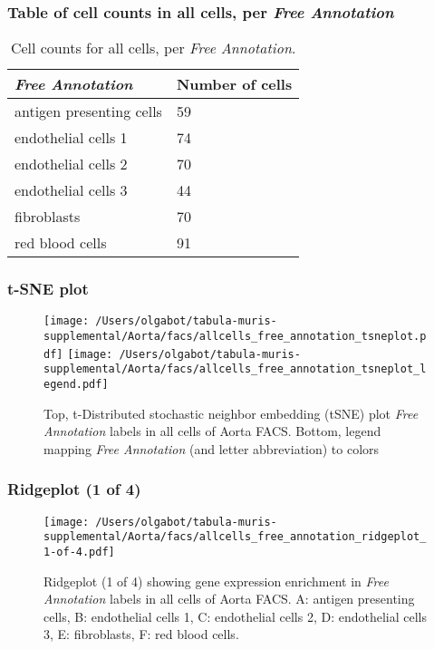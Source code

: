 \subsubsection{Table of cell counts in all cells, per \emph{Free Annotation}}\begin{table}[h]
\centering
\label{my-label}
\begin{tabular}{@{}ll@{}}
\toprule

\emph{Free Annotation}& Number of cells \\ \midrule
antigen presenting cells & 59 \\

endothelial cells 1 & 74 \\

endothelial cells 2 & 70 \\

endothelial cells 3 & 44 \\

fibroblasts & 70 \\

red blood cells & 91 \\
\bottomrule
\end{tabular}
\caption{Cell counts for all cells, per \emph{Free Annotation}.}
\end{table}

\clearpage
\subsubsection{t-SNE plot}
\begin{figure}[h]
\centering
\texttt{[image: /Users/olgabot/tabula-muris-supplemental/Aorta/facs/allcells\_free\_annotation\_tsneplot.pdf]}
\texttt{[image: /Users/olgabot/tabula-muris-supplemental/Aorta/facs/allcells\_free\_annotation\_tsneplot\_legend.pdf]}
\caption{Top, t-Distributed stochastic neighbor embedding (tSNE) plot  \emph{Free Annotation} labels in all cells of Aorta FACS. Bottom, legend mapping \emph{Free Annotation} (and letter abbreviation) to colors}
\end{figure}


\clearpage

\subsubsection{Ridgeplot (1 of 4)}
\begin{figure}[h]
\centering
\texttt{[image: /Users/olgabot/tabula-muris-supplemental/Aorta/facs/allcells\_free\_annotation\_ridgeplot\_1-of-4.pdf]}

\caption{ Ridgeplot (1 of 4)  showing gene expression enrichment in \emph{Free Annotation} labels in all cells of Aorta FACS. A: antigen presenting cells, B: endothelial cells 1, C: endothelial cells 2, D: endothelial cells 3, E: fibroblasts, F: red blood cells.}
\end{figure}


